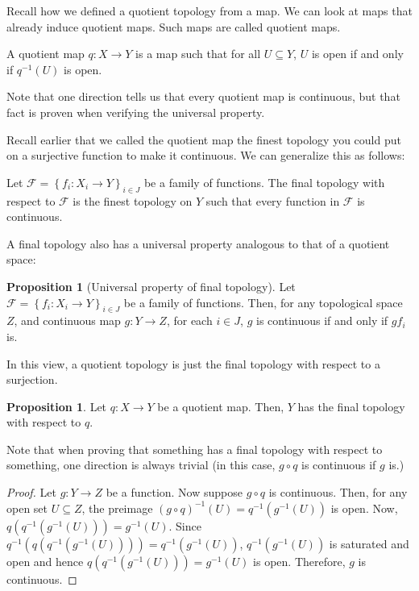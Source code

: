 \documentclass[12pt,reqno]{amsart}
\numberwithin{theorem}{section}
\theoremstyle{definition}
\theoremstyle{remark}
\numberwithin{equation}{section}
\newcommand{\set}[1]{\left \{ #1 \right \}}
\theoremstyle{definition}
\newtheorem{prop}[theorem]{Proposition}
\begin{document}
Recall how we defined a quotient topology from a map. We can look at maps that already induce quotient maps. Such maps are called quotient maps.
\begin{definition}
    A quotient map $q:X\rightarrow Y$ is a map such that for all $U \subseteq Y$, $U$ is open if and only if $q^{-1}(U)$ is open.
\end{definition}
Note that one direction tells us that every quotient map is continuous, but that fact is proven when verifying the universal property. 

Recall earlier that we called the quotient map the finest topology you could put on a surjective function to make it continuous. We can generalize this as follows:
\begin{definition}
    Let $\mathcal F = \set{f_i:X_i\rightarrow Y}_{i \in J}$ be a family of functions. The final topology with respect to $\mathcal F$ is the finest topology on $Y$ such that every function in $\mathcal F$ is continuous.
\end{definition}
A final topology also has a universal property analogous to that of a quotient space:
\begin{prop}[Universal property of final topology]
    Let $\mathcal F = \set{f_i:X_i\rightarrow Y}_{i \in J}$ be a family of functions. Then, for any topological space $Z$, and continuous map $g:Y\rightarrow Z$, for each $i \in J$, $g$ is continuous if and only if $g f_i$ is.
    \begin{center}
    \end{center}
\end{prop}
In this view, a quotient topology is just the final topology with respect to a surjection.
\begin{prop}
    Let $q:X\rightarrow Y$ be a quotient map. Then, $Y$ has the final topology with respect to $q$.
\end{prop}
Note that when proving that something has a final topology with respect to something, one direction is always trivial (in this case, $g\circ q$ is continuous if $g$ is.)
\begin{proof}
    Let $g:Y\rightarrow Z$ be a function. Now suppose $g\circ q$ is continuous. Then, for any open set $U \subseteq Z$, the preimage $(g\circ q)^{-1}(U) = q^{-1}(g^{-1}(U))$ is open. Now, $q(q^{-1}(g^{-1}(U))) = g^{-1}(U)$. Since $q^{-1}(q(q^{-1}(g^{-1}(U)))) = q^{-1}(g^{-1}(U))$, $q^{-1}(g^{-1}(U))$ is saturated and open and hence $q(q^{-1}(g^{-1}(U))) = g^{-1}(U)$ is open. Therefore, $g$ is continuous.
\end{proof}
\end{document}
